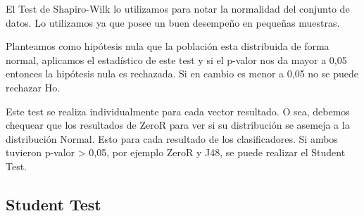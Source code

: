 \documentclass[11pt,a4paper,twoside]{tesis}
\begin{document}


El Test de Shapiro-Wilk lo utilizamos para notar la normalidad del conjunto de datos. Lo utilizamos ya que posee un buen desempeño en pequeñas muestras.


Planteamos como hipótesis nula que la población esta distribuida de forma normal, aplicamos el estadístico de este test y si el p-valor nos da mayor a 0,05 entonces la hipótesis nula es rechazada. Si en cambio es menor a 0,05 no se puede rechazar Ho.

Este test se realiza individualmente para cada vector resultado. O sea, debemos chequear que los resultados de ZeroR para ver si su distribución se asemeja a la distribución Normal. Esto para cada resultado de los clasificadores. Si ambos tuvieron p-valor > 0,05, por ejemplo ZeroR y J48, se puede realizar el Student Test. 

\subsection{Student Test}

\end{document}
